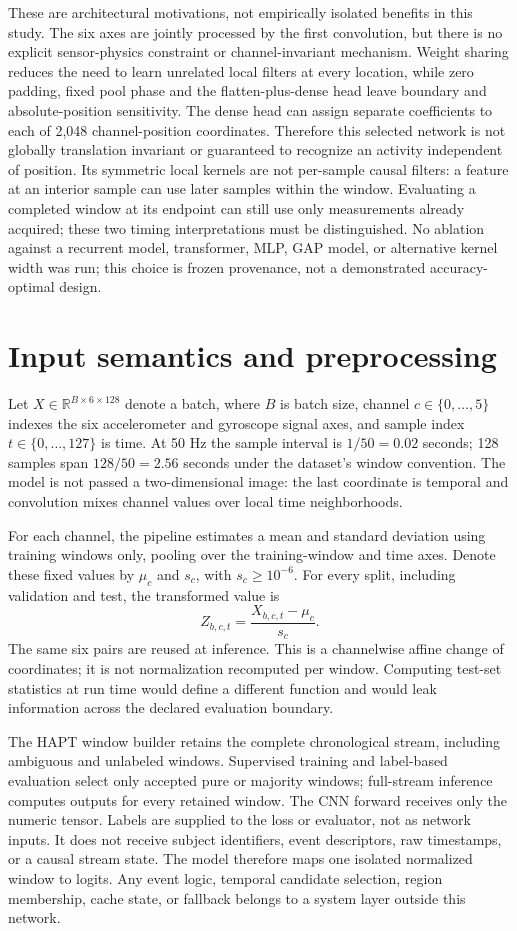 \documentclass[11pt,a4paper]{article}
\newcommand{\R}{\mathbb R}\newcommand{\relu}{\operatorname{ReLU}}
\begin{document}
These are architectural motivations, not empirically isolated benefits in this study. The six axes are jointly processed by the first convolution, but there is no explicit sensor-physics constraint or channel-invariant mechanism. Weight sharing reduces the need to learn unrelated local filters at every location, while zero padding, fixed pool phase and the flatten-plus-dense head leave boundary and absolute-position sensitivity. The dense head can assign separate coefficients to each of 2,048 channel-position coordinates. Therefore this selected network is not globally translation invariant or guaranteed to recognize an activity independent of position. Its symmetric local kernels are not per-sample causal filters: a feature at an interior sample can use later samples within the window. Evaluating a completed window at its endpoint can still use only measurements already acquired; these two timing interpretations must be distinguished. No ablation against a recurrent model, transformer, MLP, GAP model, or alternative kernel width was run; this choice is frozen provenance, not a demonstrated accuracy-optimal design.

\section{Input semantics and preprocessing}
Let $X\in\R^{B\times6\times128}$ denote a batch, where $B$ is batch size, channel $c\in\{0,\ldots,5\}$ indexes the six accelerometer and gyroscope signal axes, and sample index $t\in\{0,\ldots,127\}$ is time. At 50 Hz the sample interval is $1/50=0.02$ seconds; 128 samples span $128/50=2.56$ seconds under the dataset's window convention. The model is not passed a two-dimensional image: the last coordinate is temporal and convolution mixes channel values over local time neighborhoods.

For each channel, the pipeline estimates a mean and standard deviation using training windows only, pooling over the training-window and time axes. Denote these fixed values by $\mu_c$ and $s_c$, with $s_c\ge10^{-6}$. For every split, including validation and test, the transformed value is
\[
 Z_{b,c,t}=\frac{X_{b,c,t}-\mu_c}{s_c}.
\]
The same six pairs are reused at inference. This is a channelwise affine change of coordinates; it is not normalization recomputed per window. Computing test-set statistics at run time would define a different function and would leak information across the declared evaluation boundary.

The HAPT window builder retains the complete chronological stream, including ambiguous and unlabeled windows. Supervised training and label-based evaluation select only accepted pure or majority windows; full-stream inference computes outputs for every retained window. The CNN forward receives only the numeric tensor. Labels are supplied to the loss or evaluator, not as network inputs. It does not receive subject identifiers, event descriptors, raw timestamps, or a causal stream state. The model therefore maps one isolated normalized window to logits. Any event logic, temporal candidate selection, region membership, cache state, or fallback belongs to a system layer outside this network.
\end{document}
